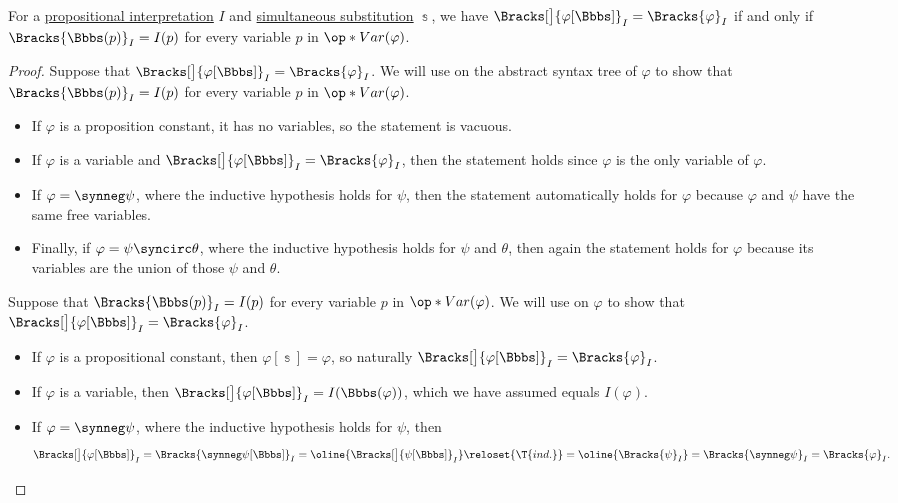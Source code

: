 \begin{proposition}\label{thm:propositional_substitution_equivalence}
  For a \hyperref[def:propositional_interpretation]{propositional interpretation} \( I \) and \hyperref[def:propositional_substitution]{simultaneous substitution} \( \Bbbs \), we have \( \Bracks[\big]{\varphi[\Bbbs]}_I = \Bracks{\varphi}_I \) if and only if \( \Bracks{\Bbbs(p)}_I = I(p) \) for every variable \( p \) in \( \op*{Var}(\varphi) \).
\end{proposition}
\begin{proof}
  \SufficiencySubProof Suppose that \( \Bracks[\big]{\varphi[\Bbbs]}_I = \Bracks{\varphi}_I\). We will use  on the abstract syntax tree of \( \varphi \) to show that \( \Bracks{\Bbbs(p)}_I = I(p) \) for every variable \( p \) in \( \op*{Var}(\varphi) \).

  \begin{itemize}
    \item If \( \varphi \) is a proposition constant, it has no variables, so the statement is vacuous.
    \item If \( \varphi \) is a variable and \( \Bracks[\big]{\varphi[\Bbbs]}_I = \Bracks{\varphi}_I \), then the statement holds since \( \varphi \) is the only variable of \( \varphi \).
    \item If \( \varphi = \synneg \psi \), where the inductive hypothesis holds for \( \psi \), then the statement automatically holds for \( \varphi \) because \( \varphi \) and \( \psi \) have the same free variables.
    \item Finally, if \( \varphi = \psi \syncirc \theta \), where the inductive hypothesis holds for \( \psi \) and \( \theta \), then again the statement holds for \( \varphi \) because its variables are the union of those \( \psi \) and \( \theta \).
  \end{itemize}

  \NecessitySubProof Suppose that \( \Bracks{\Bbbs(p)}_I = I(p) \) for every variable \( p \) in \( \op*{Var}(\varphi) \). We will use  on \( \varphi \) to show that \( \Bracks[\big]{\varphi[\Bbbs]}_I = \Bracks{\varphi}_I \).

  \begin{itemize}
    \item If \( \varphi \) is a propositional constant, then \( \varphi[\Bbbs] = \varphi \), so naturally \( \Bracks[\big]{\varphi[\Bbbs]}_I = \Bracks{\varphi}_I \).
    \item If \( \varphi \) is a variable, then \( \Bracks[\big]{\varphi[\Bbbs]}_I = I(\Bbbs(\varphi)) \), which we have assumed equals \( I(\varphi) \).
    \item If \( \varphi = \synneg \psi \), where the inductive hypothesis holds for \( \psi \), then
    \begin{equation*}
      \Bracks[\big]{\varphi[\Bbbs]}_I
      =
      \Bracks{\synneg \psi[\Bbbs]}_I
      =
      \oline{\Bracks[\big]{\psi[\Bbbs]}_I}
      \reloset {\T{ind.}} =
      \oline{\Bracks{\psi}_I}
      =
      \Bracks{\synneg \psi}_I
      =
      \Bracks{\varphi}_I.
    \end{equation*}


\end{itemize}
\end{proof}
